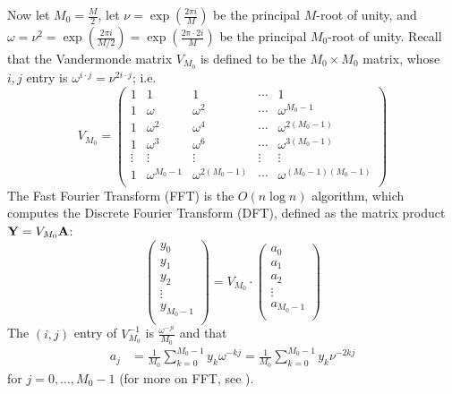 Now let $M_0=\frac{M}{2}$, let
$\nu=\exp(\frac{2\pi i}{M})$ be the principal $M$-root of unity, and
$\omega=\nu^2=\exp(\frac{2\pi i}{M/2})=\exp(\frac{2\pi \cdot 2i}{M})$ be
the principal $M_0$-root of unity. Recall that the
Vandermonde matrix $V_{M_0}$ is defined to be the
$M_0 \times M_0$ matrix, whose $i,j$ entry is
$\omega^{i \cdot j} = \nu^{2 i \cdot j}$;
i.e.
$$
V_{M_0} = \left(
\begin{array}{rrrrr}
1&1&1&\cdots&1\\
1&\omega&\omega^2&\cdots&\omega^{M_0-1}\\
1&\omega^2&\omega^4&\cdots&\omega^{2(M_0-1)}\\
1&\omega^3&\omega^6&\cdots&\omega^{3(M_0-1)}\\
\vdots& \vdots& \vdots& \vdots& \vdots\\
1&\omega^{M_0-1}&\omega^{2(M_0-1)}&\cdots&\omega^{(M_0-1)(M_0-1)}\\
\end{array}
\right)
$$
The Fast Fourier Transform (FFT) is the $O(n \log n)$
algorithm, which computes the Discrete Fourier Transform (DFT), defined
as the matrix product ${\bf Y} = V_{M_0} {\bf A}$:
$$
\left(
\begin{array}{l}
y_0\\
y_1\\
y_2\\
\vdots \\
y_{M_0-1}\\
\end{array}
\right)
= V_{M_0} \cdot
\left(
\begin{array}{l}
a_0\\
a_1\\
a_2\\
\vdots \\
a_{M_0-1}\\
\end{array}
\right)
$$
The $(i,j)$ entry of $V_{M_0}^{-1}$ is $\frac{\omega^{-j i}}{M_0}$
and that
\begin{align}
\label{eqn:ajdef}
a_j &=\frac{1}{M_0} \sum_{k=0}^{M_0-1} y_k \omega^{-kj}
=\frac{1}{M_0} \sum_{k=0}^{M_0-1} y_k \nu^{-2kj}
\end{align}
for $j=0,\ldots,M_0-1$ (for more on FFT, see \cite{cormen}).

